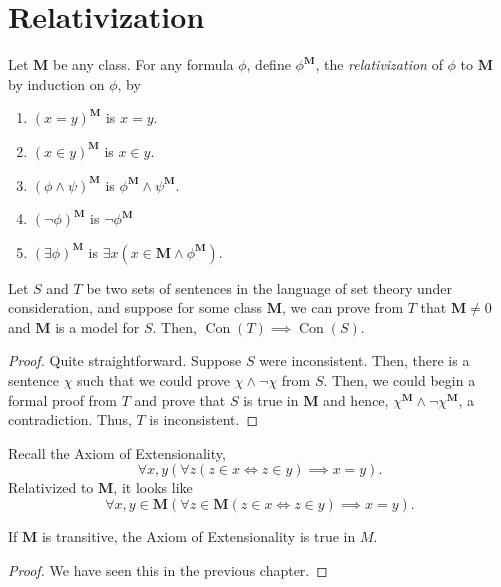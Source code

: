 \section{Relativization}

\newcommand{\M}{\mathbf{M}}
\newcommand{\Con}{\operatorname{Con}}

\begin{definition}
    Let $\mathbf M$ be any class. For any formula $\phi$, define $\phi^{\M}$, the \emph{relativization} of $\phi$ to $\M$ by induction on $\phi$, by 
    \begin{enumerate}[label=(\alph*)]
        \item $(x = y)^{\M}$ is $x = y$. 
        \item $(x\in y)^{\M}$ is $x\in y$. 
        \item $(\phi\wedge\psi)^{\M}$ is $\phi^{\M}\wedge\psi^\M$.
        \item $(\neg\phi)^\M$ is $\neg\phi^\M$ 
        \item $(\exists\phi)^\M$ is $\exists x(x\in\M\wedge\phi^\M)$.
    \end{enumerate}
\end{definition}

\begin{lemma}
    Let $S$ and $T$ be two sets of sentences in the language of set theory under consideration, and suppose for some class $\M$, we can prove from $T$ that $\M\ne 0$ and $\M$ is a model for $S$. Then, $\Con(T)\implies\Con(S)$.
\end{lemma}
\begin{proof}
    Quite straightforward. Suppose $S$ were inconsistent. Then, there is a sentence $\chi$ such that we could prove $\chi\wedge\neg\chi$ from $S$. Then, we could begin a formal proof from $T$ and prove that $S$ is true in $\M$ and hence, $\chi^\M\wedge\neg\chi^\M$, a contradiction. Thus, $T$ is inconsistent.
\end{proof}

Recall the Axiom of Extensionality, 
\begin{equation*}
    \forall x,y\left(\forall z(z\in x\iff z\in y)\implies x = y\right).
\end{equation*}
Relativized to $\M$, it looks like 
\begin{equation*}
    \forall x,y\in\M\left(\forall z\in\M(z\in x\iff z\in y)\implies x = y\right).
\end{equation*}

\begin{lemma}
    If $\M$ is transitive, the Axiom of Extensionality is true in $M$.
\end{lemma}
\begin{proof}
    We have seen this in the previous chapter.
\end{proof}

